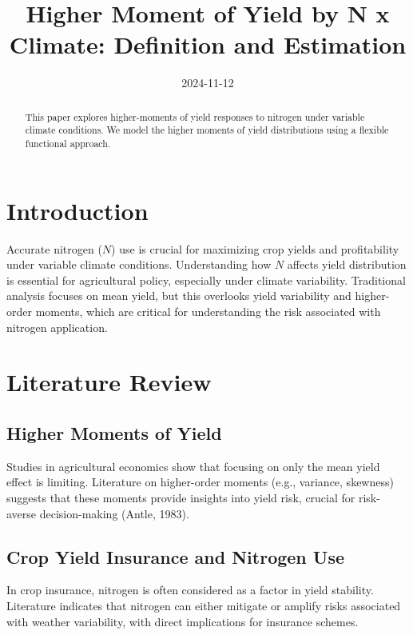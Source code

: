 \documentclass[
  letterpaper,
  DIV=11,
  numbers=noendperiod]{scrartcl}
\title{Higher Moment of Yield by N x Climate: Definition and Estimation}
\author{}
\date{2024-11-12}
\begin{document}
\maketitle
\begin{abstract}
This paper explores higher-moments of yield responses to nitrogen under
variable climate conditions. We model the higher moments of yield
distributions using a flexible functional approach.
\end{abstract}


\newpage

\section{Introduction}\label{introduction}

Accurate nitrogen (\(N\)) use is crucial for maximizing crop yields and
profitability under variable climate conditions. Understanding how \(N\)
affects yield distribution is essential for agricultural policy,
especially under climate variability. Traditional analysis focuses on
mean yield, but this overlooks yield variability and higher-order
moments, which are critical for understanding the risk associated with
nitrogen application.

\section{Literature Review}\label{literature-review}

\subsection{Higher Moments of Yield}\label{higher-moments-of-yield}

Studies in agricultural economics show that focusing on only the mean
yield effect is limiting. Literature on higher-order moments (e.g.,
variance, skewness) suggests that these moments provide insights into
yield risk, crucial for risk-averse decision-making (Antle, 1983).

\subsection{Crop Yield Insurance and Nitrogen
Use}\label{crop-yield-insurance-and-nitrogen-use}

In crop insurance, nitrogen is often considered as a factor in yield
stability. Literature indicates that nitrogen can either mitigate or
amplify risks associated with weather variability, with direct
implications for insurance schemes.
\end{document}
